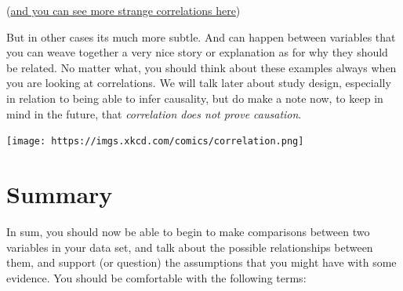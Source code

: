 \documentclass[]{book}
\theoremstyle{definition}
\theoremstyle{definition}
\theoremstyle{definition}
\theoremstyle{remark}
\begin{document}
(\href{http://www.tylervigen.com/spurious-correlations}{and you can see
more strange correlations here})

But in other cases its much more subtle. And can happen between
variables that you can weave together a very nice story or explanation
as for why they should be related. No matter what, you should think
about these examples always when you are looking at correlations. We
will talk later about study design, especially in relation to being able
to infer causality, but do make a note now, to keep in mind in the
future, that \emph{correlation does not prove causation}.

\texttt{[image: https://imgs.xkcd.com/comics/correlation.png]}

\hypertarget{summary-2}{%
\section{Summary}\label{summary-2}}

In sum, you should now be able to begin to make comparisons between two
variables in your data set, and talk about the possible relationships
between them, and support (or question) the assumptions that you might
have with some evidence. You should be comfortable with the following
terms:
\end{document}
